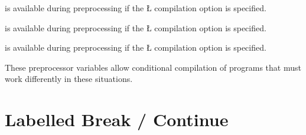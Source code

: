 \documentclass[openright,twoside]{report}
\begin{document}
\begin{prefix}
\item[\LGinlinetrue\LGbegin\lgrinde\L{\LB{\V{\_\_U\_YIELD\_\_}}}\endlgrinde\LGend{}]
is available during preprocessing if the \LGinlinetrue\LGbegin\lgrinde\L{}\endlgrinde\LGend{} compilation option is specified.

\item[\LGinlinetrue\LGbegin\lgrinde\L{\LB{\V{\_\_U\_VERIFY\_\_}}}\endlgrinde\LGend{}]
is available during preprocessing if the \LGinlinetrue\LGbegin\lgrinde\L{}\endlgrinde\LGend{} compilation option is specified.

\item[\LGinlinetrue\LGbegin\lgrinde\L{\LB{\V{\_\_U\_MULTI\_\_}}}\endlgrinde\LGend{}]
is available during preprocessing if the \LGinlinetrue\LGbegin\lgrinde\L{}\endlgrinde\LGend{} compilation option is specified.
\end{prefix}
These preprocessor variables allow conditional compilation of programs that must work differently in these situations.


\section{Labelled Break / Continue}
\label{s:LabelledBreakContinue}
\end{document}
